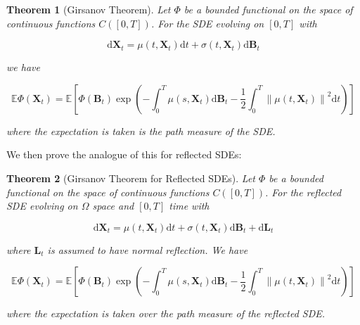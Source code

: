 \documentclass{article}
\theoremstyle{plain}
\newtheorem{theorem}{Theorem}[section]
\theoremstyle{definition}
\theoremstyle{remark}
\newcommand{\E}{\mathbb{E}}
\newcommand{\paren}[1]{\left(#1\right)}
\newcommand{\sqbrac}[1]{\left[#1\right]}
\newcommand{\norm}[1]{\left\|#1\right\|}
\renewcommand{\vec}{\mathbf}
\newcommand{\dd}{\mathrm{d}}
\begin{document}
\begin{theorem}[Girsanov Theorem]\label{thm:app:girs}
    Let $\Phi$ be a bounded functional on the space of continuous functions $C([0, T])$. For the SDE evolving on $[0, T]$ with

    \begin{equation}
        \dd \vec{X}_t = \mu(t, \vec{X}_t) \dd t + \sigma(t, \vec{X}_t) \dd \vec{B}_t
    \end{equation}

    we have

    \begin{equation}
        \E \Phi(\vec{X}_t) = \E \sqbrac{\Phi(\vec{B}_t) \exp\paren{-\int_0^T \mu(s, \vec{X}_t) \dd\vec{B}_t - \frac{1}{2} \int_0^T \norm{\mu(t, \vec{X}_t)}^2 \dd t}}
    \end{equation}

    where the expectation is taken is the path measure of the SDE.
\end{theorem}

We then prove the analogue of this for reflected SDEs:

\begin{theorem}[Girsanov Theorem for Reflected SDEs]\label{thm:app:girsrefl}
    Let $\Phi$ be a bounded functional on the space of continuous functions $C([0, T])$. For the reflected SDE evolving on $\Omega$ space and $[0, T]$ time with

    \begin{equation}
        \dd \vec{X}_t = \mu(t, \vec{X}_t) \dd t + \sigma(t, \vec{X}_t) \dd \vec{B}_t + \dd \vec{L}_t
    \end{equation}

    where $\vec{L}_t$ is assumed to have normal reflection. We have

    \begin{equation}
        \E \Phi(\vec{X}_t) = \E \sqbrac{\Phi(\vec{B}_t) \exp\paren{-\int_0^T \mu(s, \vec{X}_t) \dd\vec{B}_t - \frac{1}{2} \int_0^T \norm{\mu(t, \vec{X}_t)}^2 \dd t}}
    \end{equation}

    where the expectation is taken over the path measure of the reflected SDE.
\end{theorem}
\end{document}
